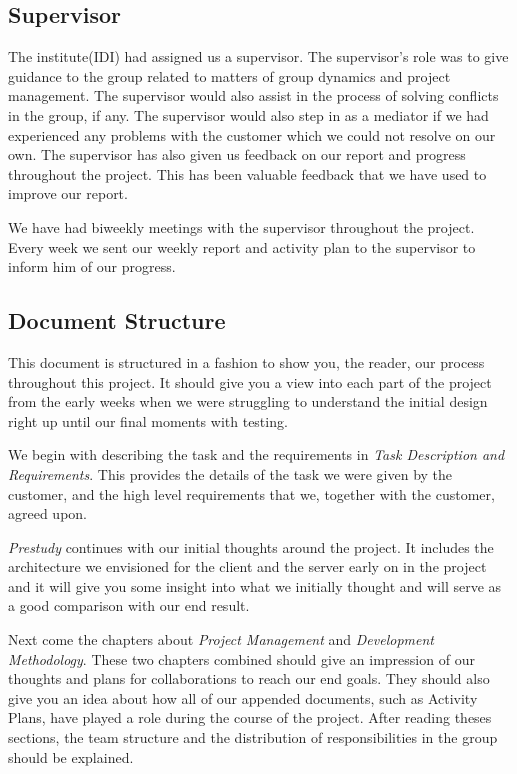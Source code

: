     
    \subsection{Supervisor}\label{Supervisor}
    
    The institute(IDI) had assigned us a supervisor. The supervisor's role was to give guidance to the group related to matters of group dynamics and project management. The supervisor would also assist in the process of solving conflicts in the group, if any. The supervisor would also step in as a mediator if we had experienced any problems with the customer which we could not resolve on our own. The supervisor has also given us feedback on our report and progress throughout the project. This has been valuable feedback that we have used to improve our report.  
    
    We have had biweekly meetings with the supervisor throughout the project. Every week we sent our weekly report and activity plan to the supervisor to inform him of our progress. 
    
    
    \subsection{Document Structure}\label{Document Structure}
    This document is structured in a fashion to show you, the reader, our process throughout this project. It should give you a view into each part of the project from the early weeks when we were struggling to understand the initial design right up until our final moments with testing. 
    
    We begin with describing the task and the requirements in \emph{Task Description and Requirements}. This provides the details of the task we were given by the customer, and the high level requirements that we, together with the customer, agreed upon.
    
    \emph{Prestudy} continues with our initial thoughts around the project. It includes the architecture we envisioned for the client and the server early on in the project and it will give you some insight into what we initially thought and will serve as a good comparison with our end result.
    
    Next come the chapters about \emph{Project Management} and \emph{Development Methodology}. These two chapters combined should give an impression of our thoughts and plans for collaborations to reach our end goals. They should also give you an idea about how all of our appended documents, such as Activity Plans, have played a role during the course of the project. After reading theses sections, the team structure and the distribution of responsibilities in the group should be explained.
    
